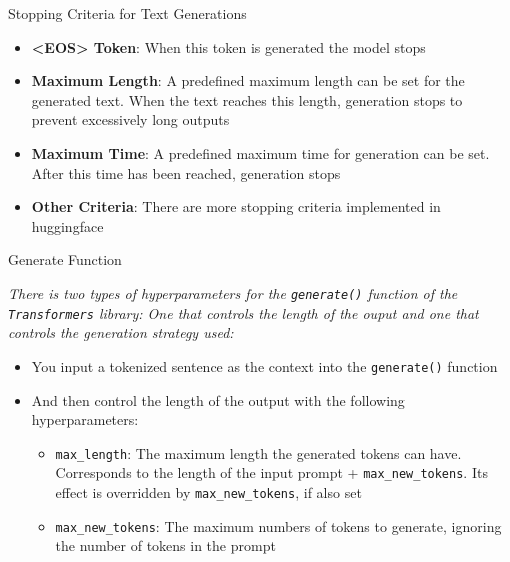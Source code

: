 \documentclass[11pt,compress,t,notes=noshow, xcolor=table]{beamer}
\begin{document}

\begin{frame}{Stopping Criteria for Text Generations}

\vfill

\begin{itemize}
    \item \textbf{<EOS> Token}: When this token is generated the model stops
    \item \textbf{Maximum Length}: A predefined maximum length can be set for the generated text. When the text reaches this length, generation stops to prevent excessively long outputs
    \item \textbf{Maximum Time}: A predefined maximum time for generation can be set. After this time has been reached, generation stops
    \item \textbf{Other Criteria}: There are more stopping criteria implemented in huggingface 
\end{itemize}

\vfill

\end{frame}


\begin{frame}{Generate Function}

\textit{There is two types of hyperparameters for the \texttt{generate()} function of the \texttt{Transformers} library: One that controls the length of the ouput and one that controls the generation strategy used:} 

\begin{itemize}
    \item You input a tokenized sentence as the context into the \texttt{generate()} function
    \item And then control the length of the output with the following hyperparameters:
    \begin{itemize}
        \item \texttt{max\_length}: The maximum length the generated tokens can have. Corresponds to the length of the input prompt + \texttt{max\_new\_tokens}. Its effect is overridden by \texttt{max\_new\_tokens}, if also set
        \item \texttt{max\_new\_tokens}: The maximum numbers of tokens to generate, ignoring the number of tokens in the prompt
    \end{itemize}
\end{itemize}

\vfill

\end{frame}
\end{document}
